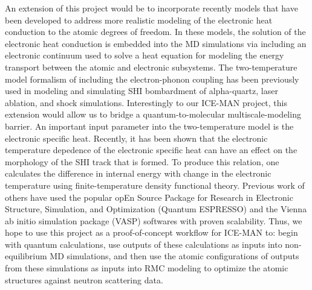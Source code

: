 An extension of this project would be to incorporate recently models that have been developed to address more realistic modeling of the electronic heat conduction to the atomic degrees of freedom. In these models, the solution of the electronic heat conduction is embedded into the MD simulations via including an electronic continuum used to solve a heat equation for modeling the energy transport between the atomic and electronic subsystems. The two-temperature model formalism of including the electron-phonon coupling has been previously used in modeling and simulating SHI bombardment of alpha-quartz, laser ablation, and shock simulations. Interestingly to our ICE-MAN project, this extension would allow us to bridge a quantum-to-molecular multiscale-modeling barrier. An important input parameter into the two-temperature model is the electronic specific heat. Recently, it has been shown that the electronic temperature depedence of the electronic specific heat can have an effect on the morphology of the SHI track that is formed.  To produce this relation, one calculates the difference in internal energy with change in the electronic temperature using finite-temperature density functional theory. Previous work of others have used the popular opEn Source Package for Research in Electronic Structure, Simulation, and Optimization (Quantum ESPRESSO) and the Vienna ab initio simulation package (VASP) softwares with proven scalability. Thus, we hope to use this project as a proof-of-concept workflow for ICE-MAN to: begin with quantum calculations, use outputs of these calculations as inputs into non-equilibrium MD simulations, and then use the atomic configurations of outputs from these simulations as inputs into RMC modeling to optimize the atomic structures against neutron scattering data.
